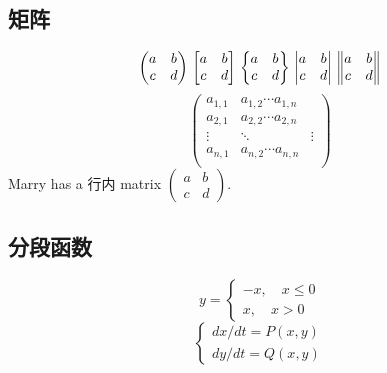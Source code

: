 \documentclass[UTF8]{ctexart}
\begin{document}
 \subsection{矩阵}
     \[ \begin{pmatrix}
             a & b \\c&d
         \end{pmatrix} \\
         \begin{bmatrix}
             a & b \\c&d
         \end{bmatrix} \\
         \begin{Bmatrix}
             a & b \\c&d
         \end{Bmatrix} \\
         \begin{vmatrix}
             a & b \\c&d
         \end{vmatrix} \\
         \begin{Vmatrix}
             a & b \\c&d
         \end{Vmatrix}
     \]
     \[ \begin{pmatrix}
             a_{1,1} & a_{1,2} \cdots a_{1,n}          \\
             a_{2,1} & a_{2,2} \cdots a_{2,n}          \\
             \vdots  & \ddots                 & \vdots \\
             a_{n,1} & a_{n,2} \cdots a_{n,n}          \\
         \end{pmatrix}
     \]
     Marry has a 行内 matrix $ ( \begin{smallmatrix} a&b\\c&d \end{smallmatrix} ) $.
 \subsection{分段函数}
     \[ y= \begin{cases}
             -x,\quad x\leq 0 \\
             x,\quad x>0
         \end{cases} \]
    \[\begin{cases}
        dx/dt=P(x,y)\\
        dy/dt=Q(x,y)
    \end{cases}
        \]
\end{document}

